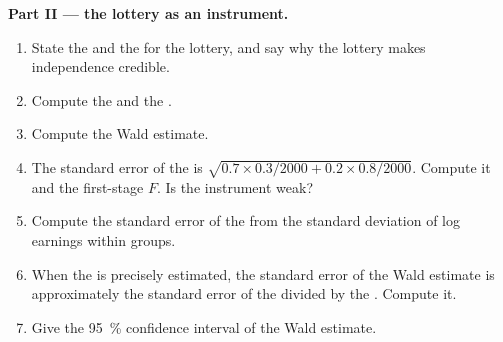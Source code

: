 \begin{problem}
\medskip\noindent\textbf{Part II --- the lottery as an instrument.}
\begin{enumerate}[resume]
\item State the  and the  for the
lottery, and say why the lottery makes independence credible.
\item Compute the  and the .
\item Compute the Wald estimate.
\item The standard error of the  is
$\sqrt{0.7 \times 0.3 / 2000 + 0.2 \times 0.8 / 2000}$. Compute it and the
first-stage $F$. Is the instrument weak?
\item Compute the standard error of the  from the standard
deviation of log earnings within groups.
\item When the  is precisely estimated, the standard error of the
Wald estimate is approximately the standard error of the  divided
by the . Compute it.
\item Give the 95~\% confidence interval of the Wald estimate.
\end{enumerate}


\end{problem}
